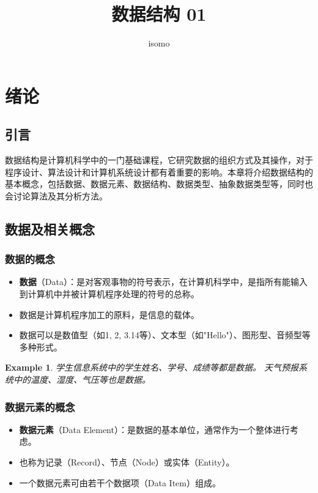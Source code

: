 \documentclass{../../note}
\title{数据结构 01}
\author{isomo}
\newtheorem{example}{Example}
\begin{document}
\maketitle

\section{绪论}

\subsection{引言}
数据结构是计算机科学中的一门基础课程，它研究数据的组织方式及其操作，对于程序设计、算法设计和计算机系统设计都有着重要的影响。本章将介绍数据结构的基本概念，包括数据、数据元素、数据结构、数据类型、抽象数据类型等，同时也会讨论算法及其分析方法。

\subsection{数据及相关概念}

\subsubsection{数据的概念}
\begin{itemize}
  \item \textbf{数据}（Data）：是对客观事物的符号表示，在计算机科学中，是指所有能输入到计算机中并被计算机程序处理的符号的总称。
  \item 数据是计算机程序加工的原料，是信息的载体。
  \item 数据可以是数值型（如1, 2, 3.14等）、文本型（如"Hello"）、图形型、音频型等多种形式。
\end{itemize}

\begin{example}
  学生信息系统中的学生姓名、学号、成绩等都是数据。
  天气预报系统中的温度、湿度、气压等也是数据。
\end{example}

\subsubsection{数据元素的概念}
\begin{itemize}
  \item \textbf{数据元素}（Data Element）：是数据的基本单位，通常作为一个整体进行考虑。
  \item 也称为记录（Record）、节点（Node）或实体（Entity）。
  \item 一个数据元素可由若干个数据项（Data Item）组成。
\end{itemize}
\end{document}
